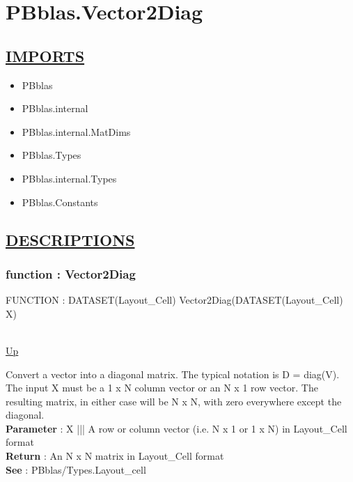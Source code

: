 \chapter*{PBblas.Vector2Diag}
\hypertarget{PBblas.Vector2Diag}{}

\section*{\underline{IMPORTS}}
\begin{itemize}
\item PBblas
\item PBblas.internal
\item PBblas.internal.MatDims
\item PBblas.Types
\item PBblas.internal.Types
\item PBblas.Constants
\end{itemize}

\section*{\underline{DESCRIPTIONS}}
\subsection*{function : Vector2Diag}
\hypertarget{ecldoc:pbblas.vector2diag}{FUNCTION : DATASET(Layout\_Cell) Vector2Diag(DATASET(Layout\_Cell) X)} \\
\hyperlink{ecldoc:}{Up} \\
\par
Convert a vector into a diagonal matrix. The typical notation is D = diag(V). The input X must be a 1 x N column vector or an N x 1 row vector. The resulting matrix, in either case will be N x N, with zero everywhere except the diagonal. \\
\textbf{Parameter} : X ||| A row or column vector (i.e. N x 1 or 1 x N) in Layout\_Cell format \\
\textbf{Return} : An N x N matrix in Layout\_Cell format \\
\textbf{See} : PBblas/Types.Layout\_cell \\
